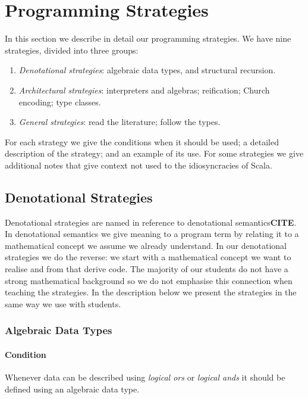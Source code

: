 \section{Programming Strategies}
\label{sec:programming-strategies}

In this section we describe in detail our programming strategies. We have nine strategies, divided into three groups:

\begin{enumerate}
\item \emph{Denotational strategies}: algebraic data types, and structural recursion.
\item \emph{Architectural strategies}: interpreters and algebras; reification; Church encoding; type classes.
\item \emph{General strategies}: read the literature; follow the types.
\end{enumerate}

For each strategy we give the conditions when it should be used; a detailed description of the strategy; and an example of its use. For some strategies we give additional notes that give context not used to the idiosyncracies of Scala.


\subsection{Denotational Strategies}

Denotational strategies are named in reference to denotational semantics\textbf{CITE}. In denotational semantics we give meaning to a program term by relating it to a mathematical concept we assume we already understand. In our denotational strategies we do the reverse: we start with a mathematical concept we want to realise and from that derive code. The majority of our students do not have a strong mathematical background so we do not emphasise this connection when teaching the strategies. In the description below we present the strategies in the same way we use with students.

\subsubsection{Algebraic Data Types}
\paragraph{Condition} Whenever data can be described using \emph{logical ors} or \emph{logical ands} it should be defined using an algebraic data type.

